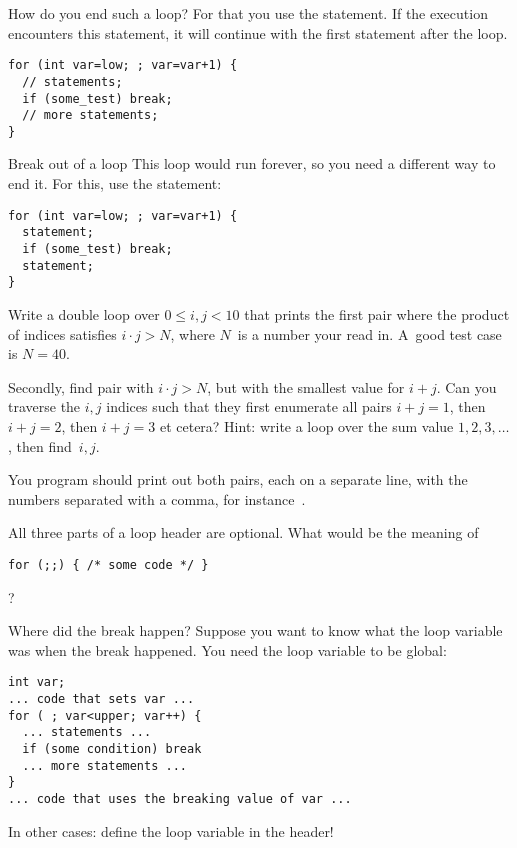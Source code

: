 How do you end such a loop? For that you use the
 statement. If the execution encounters this
statement, it will continue with the first statement after the loop.

\begin{lstlisting}
for (int var=low; ; var=var+1) {
  // statements;
  if (some_test) break;
  // more statements;
}
\end{lstlisting}

\begin{slide}{Break out of a loop}
  \label{sl:for-break}
  This loop would run forever, so you need a different way to end
  it. For this, use the  statement:
\begin{lstlisting}
for (int var=low; ; var=var+1) {
  statement;
  if (some_test) break;
  statement;
}
\end{lstlisting}
\end{slide}

\begin{exercise}
  \label{ex:ij-product}
  Write a double loop over $0\leq i,j<10$ that prints the first pair
  where the product of indices satisfies $i\cdot j> N$, where $N$~is a
  number your read in. A~good test case is $N=40$.

  Secondly, find pair with $i\cdot j>N$, but with the smallest value for $i+j$.
  Can you traverse the $i,j$ indices such that they first enumerate
  all pairs $i+j=1$, then $i+j=2$, then $i+j=3$ et cetera? Hint:
  write a loop over the sum value $1,2,3,\ldots$, then find~$i,j$.

  You program should print out both pairs, each on a separate line,
  with the numbers separated with a comma, for instance~.
\end{exercise}

\begin{exercise}
  All three parts of a loop header are optional. What would be the
  meaning of
\begin{lstlisting}
for (;;) { /* some code */ }
\end{lstlisting}
?
\end{exercise}

\begin{block}{Where did the break happen?}
  \label{sl:for-break-var}
  Suppose you want to know what the loop variable was when the break happened.
  You need the loop variable to be global:
\begin{lstlisting}
int var;
... code that sets var ...
for ( ; var<upper; var++) {
  ... statements ...
  if (some condition) break
  ... more statements ...
}
... code that uses the breaking value of var ...
\end{lstlisting}
In other cases: define the loop variable in the header!
\end{block}

